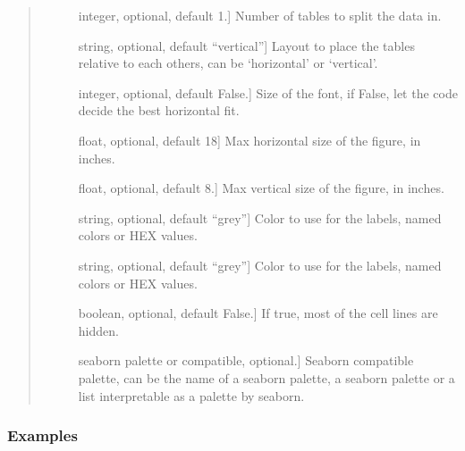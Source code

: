\documentclass[letterpaper,10pt,english]{sphinxmanual}
\begin{document}
\begin{fulllineitems}
\begin{quote}
\begin{description}
\begin{description}
\item[{}] \leavevmode{[}integer, optional, default 1.{]}
Number of tables to split the data in.

\item[{}] \leavevmode{[}string, optional, default “vertical”{]}
Layout to place the tables relative to each others, can be
‘horizontal’ or ‘vertical’.

\item[{}] \leavevmode{[}integer, optional, default False.{]}
Size of the font, if False, 
let the code decide the best horizontal fit.

\item[{}] \leavevmode{[}float, optional, default 18{]}
Max horizontal size of the figure, in inches.

\item[{}] \leavevmode{[}float, optional, default 8.{]}
Max vertical size of the figure, in inches.

\item[{}] \leavevmode{[}string, optional, default “grey”{]}
Color to use for the labels, named colors or HEX values.

\item[{}] \leavevmode{[}string, optional, default “grey”{]}
Color to use for the labels, named colors or HEX values.

\item[{}] \leavevmode{[}boolean, optional, default False.{]}
If true, most of the cell lines are hidden.

\item[{}] \leavevmode{[}seaborn palette or compatible, optional.{]}
Seaborn compatible palette, 
can be the name of a seaborn palette, 
a seaborn palette or a list interpretable 
as a palette by seaborn.

\end{description}

\end{description}\end{quote}
\subsubsection*{Examples}


\end{fulllineitems}
\end{document}
